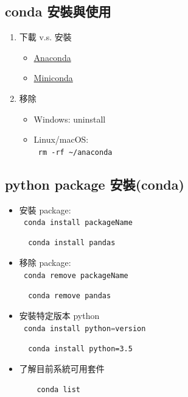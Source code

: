 \documentclass[a4paper,12pt]{article}
\begin{document}
\subsection{conda 安裝與使用}
\label{sec:org7bdb010}
\begin{enumerate}
\item 下載 v.s. 安裝
\label{sec:orgb46ffae}
\begin{itemize}
\item \href{https://www.anaconda.com/distribution/}{Anaconda}\\
\item \href{https://docs.conda.io/en/latest/miniconda.html}{Miniconda}\\
\end{itemize}
\item 移除
\label{sec:org6b8f81d}
\begin{itemize}
\item Windows: uninstall\\
\item Linux/macOS:\\
\lstinline[breaklines=true,language=shell], rm -rf ~/anaconda ,\\
\end{itemize}
\end{enumerate}
\subsection{python package 安裝(conda)}
\label{sec:org71e65d3}
\begin{itemize}
\item 安裝 package:\\
\lstinline[breaklines=true,language=Python]~ conda install packageName ~\\
\lstset{breaklines=true,language=shell,label= ,caption= ,captionpos=b,numbers=none}
\begin{lstlisting}
  conda install pandas
\end{lstlisting}
\item 移除 package:\\
\lstinline[breaklines=true,language=Python]~ conda remove packageName ~\\
\lstset{breaklines=true,language=shell,label= ,caption= ,captionpos=b,numbers=none}
\begin{lstlisting}
  conda remove pandas
\end{lstlisting}
\item 安裝特定版本 python\\
\lstinline[breaklines=true,language=Python]~ conda install python=version ~\\
\lstset{breaklines=true,language=shell,label= ,caption= ,captionpos=b,numbers=none}
\begin{lstlisting}
  conda install python=3.5
\end{lstlisting}
\item 了解目前系統可用套件\\
\lstset{breaklines=true,language=shell,label= ,caption= ,captionpos=b,numbers=none}
\begin{lstlisting}
    conda list
\end{lstlisting}
\end{itemize}
\end{document}
